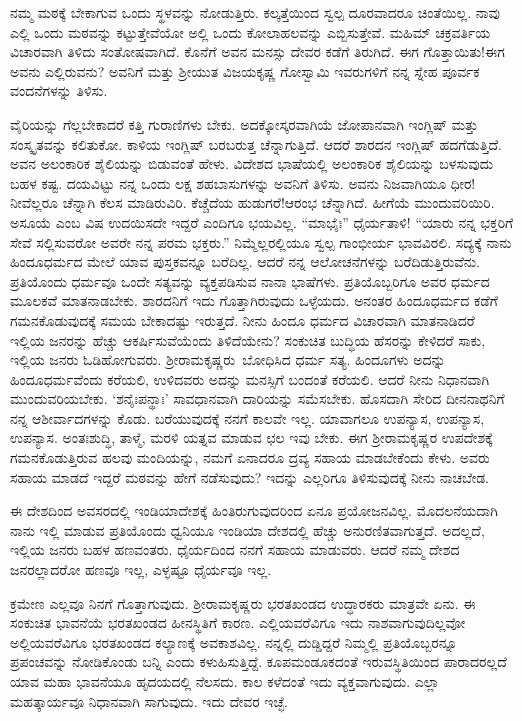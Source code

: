 ನಮ್ಮ ಮಠಕ್ಕೆ ಬೇಕಾಗುವ ಒಂದು ಸ್ಥಳವನ್ನು ನೋಡುತ್ತಿರು. ಕಲ್ಕತ್ತೆಯಿಂದ ಸ್ವಲ್ಪ ದೂರವಾದರೂ ಚಿಂತೆಯಿಲ್ಲ. ನಾವು ಎಲ್ಲಿ ಒಂದು ಮಠವನ್ನು ಕಟ್ಟುತ್ತೇವೆಯೋ ಅಲ್ಲಿ ಒಂದು ಕೋಲಾಹಲವನ್ನು ಎಬ್ಬಿಸುತ್ತೇವೆ. ಮಹಿಮ್ ಚಕ್ರವರ್ತಿಯ ವಿಚಾರವಾಗಿ ತಿಳಿದು ಸಂತೋಷವಾಗಿದೆ. ಕೊನೆಗೆ ಅವನ ಮನಸ್ಸು ದೇವರ ಕಡೆಗೆ ತಿರುಗಿದೆ. ಈಗ ಗೊತ್ತಾಯಿತು!ಈಗ ಅವನು ಎಲ್ಲಿರುವನು? ಅವನಿಗೆ ಮತ್ತು ಶ‍್ರೀಯುತ ವಿಜಯಕೃಷ್ಣ ಗೋಸ್ವಾಮಿ ಇವರುಗಳಿಗೆ ನನ್ನ ಸ್ನೇಹ ಪೂರ್ವಕ ವಂದನೆಗಳನ್ನು ತಿಳಿಸು.

ವೈರಿಯನ್ನು ಗೆಲ್ಲಬೇಕಾದರೆ ಕತ್ತಿ ಗುರಾಣಿಗಳು ಬೇಕು. ಅದಕ್ಕೋಸ್ಕರವಾಗಿಯೆ ಜೋಪಾನವಾಗಿ ಇಂಗ್ಲಿಷ್ ಮತ್ತು ಸಂಸ್ಕೃತವನ್ನು ಕಲಿತುಕೋ. ಕಾಳಿಯ ಇಂಗ್ಲಿಷ್ ಬರಬರುತ್ತ ಚೆನ್ನಾಗುತ್ತಿದೆ. ಆದರೆ ಶಾರದನ ಇಂಗ್ಲಿಷ್ ಹದಗೆಡುತ್ತಿದೆ. ಅವನ ಅಲಂಕಾರಿಕ ಶೈಲಿಯನ್ನು ಬಿಡುವಂತೆ ಹೇಳು. ವಿದೇಶದ ಭಾಷೆಯಲ್ಲಿ ಅಲಂಕಾರಿಕ ಶೈಲಿಯನ್ನು ಬಳಸುವುದು ಬಹಳ ಕಷ್ಟ. ದಯವಿಟ್ಟು ನನ್ನ ಒಂದು ಲಕ್ಷ ಶಹಬಾಸುಗಳನ್ನು ಅವನಿಗೆ ತಿಳಿಸು. ಅವನು ನಿಜವಾಗಿಯೂ ಧೀರ! ನೀವೆಲ್ಲರೂ ಚೆನ್ನಾಗಿ ಕೆಲಸ ಮಾಡಿರುವಿರಿ. ಕೆಚ್ಚೆದೆಯ ಹುಡುಗರೆ!ಆರಂಭ ಚೆನ್ನಾಗಿದೆ. ಹೀಗೆಯೆ ಮುಂದುವರಿಯಿರಿ. ಅಸೂಯೆ ಎಂಬ ವಿಷ ಉದಯಿಸದೇ ಇದ್ದರೆ ಎಂದಿಗೂ ಭಯವಿಲ್ಲ. “ಮಾಭೈಃ” ಧೈರ್ಯತಾಳಿ! “ಯಾರು ನನ್ನ ಭಕ್ತರಿಗೆ ಸೇವೆ ಸಲ್ಲಿಸುವರೋ ಅವರೇ ನನ್ನ ಪರಮ ಭಕ್ತರು.” ನಿಮ್ಮೆಲ್ಲರಲ್ಲಿಯೂ ಸ್ವಲ್ಪ ಗಾಂಭೀರ್ಯ ಭಾವವಿರಲಿ. ಸದ್ಯಕ್ಕೆ ನಾನು ಹಿಂದೂಧರ್ಮದ ಮೇಲೆ ಯಾವ ಪುಸ್ತಕವನ್ನೂ ಬರೆದಿಲ್ಲ. ಆದರೆ ನನ್ನ ಆಲೋಚನೆಗಳನ್ನು ಬರೆದಿಡುತ್ತಿರುವೆನು. ಪ್ರತಿಯೊಂದು ಧರ್ಮವೂ ಒಂದೇ ಸತ್ಯವನ್ನು ವ್ಯಕ್ತಪಡಿಸುವ ನಾನಾ ಭಾಷೆಗಳು. ಪ್ರತಿಯೊಬ್ಬರಿಗೂ ಅವರ ಧರ್ಮದ ಮೂಲಕವೆ ಮಾತನಾಡಬೇಕು. ಶಾರದನಿಗೆ ಇದು ಗೊತ್ತಾಗಿರುವುದು ಒಳ್ಳೆಯದು. ಅನಂತರ ಹಿಂದೂಧರ್ಮದ ಕಡೆಗೆ ಗಮನಕೊಡುವುದಕ್ಕೆ ಸಮಯ ಬೇಕಾದಷ್ಟು ಇರುತ್ತದೆ. ನೀನು ಹಿಂದೂ ಧರ್ಮದ ವಿಚಾರವಾಗಿ ಮಾತನಾಡಿದರೆ ಇಲ್ಲಿಯ ಜನರನ್ನು ಹೆಚ್ಚು ಆಕರ್ಷಿಸುವೆಯೆಂದು ತಿಳಿದೆಯೇನು? ಸಂಕುಚಿತ ಬುದ್ಧಿಯ ಹೆಸರನ್ನು ಕೇಳಿದರೆ ಸಾಕು, ಇಲ್ಲಿಯ ಜನರು ಓಡಿಹೋಗುವರು. \hbox{ಶ‍್ರೀರಾಮಕೃಷ್ಣರು ಬೋಧಿಸಿದ} ಧರ್ಮ ಸತ್ಯ. ಹಿಂದೂಗಳು ಅದನ್ನು ಹಿಂದೂಧರ್ಮವೆಂದು ಕರೆಯಲಿ, ಉಳಿದವರು ಅದನ್ನು ಮನಸ್ಸಿಗೆ ಬಂದಂತೆ ಕರೆಯಲಿ. ಆದರೆ ನೀನು ನಿಧಾನವಾಗಿ ಮುಂದುವರಿಯಬೇಕು. ‘ಶನೈಃಪನ್ಥಾಃ’ ಸಾವಧಾನವಾಗಿ ದಾರಿಯನ್ನು ಸಮೆಸಬೇಕು. ಹೊಸದಾಗಿ ಸೇರಿದ ದೀನನಾಥನಿಗೆ ನನ್ನ ಆಶೀರ್ವಾದಗಳನ್ನು ಕೊಡು. ಬರೆಯುವುದಕ್ಕೆ ನನಗೆ ಕಾಲವೇ ಇಲ್ಲ. ಯಾವಾಗಲೂ ಉಪನ್ಯಾಸ, ಉಪನ್ಯಾಸ, ಉಪನ್ಯಾಸ. ಅಂತಃಶುದ್ಧಿ, ತಾಳ್ಮೆ, ಮರಳಿ ಯತ್ನವ ಮಾಡುವ ಛಲ ಇವು ಬೇಕು. ಈಗ ಶ‍್ರೀರಾಮಕೃಷ್ಣರ ಉಪದೇಶಕ್ಕೆ ಗಮನಕೊಡುತ್ತಿರುವ ಹಲವು ಮಂದಿಯನ್ನು, ನಮಗೆ ಏನಾದರೂ ದ್ರವ್ಯ ಸಹಾಯ ಮಾಡಬೇಕೆಂದು ಕೇಳು. ಅವರು ಸಹಾಯ ಮಾಡದೆ ಇದ್ದರೆ ಮಠವನ್ನು ಹೇಗೆ ನಡೆಸುವುದು? ಇದನ್ನು ಎಲ್ಲರಿಗೂ ತಿಳಿಸುವುದಕ್ಕೆ ನೀನು ನಾಚಬೇಡ.

ಈ ದೇಶದಿಂದ ಅವಸರದಲ್ಲಿ ಇಂಡಿಯಾದೇಶಕ್ಕೆ ಹಿಂತಿರುಗುವುದರಿಂದ ಏನೂ ಪ್ರಯೋಜನವಿಲ್ಲ. ಮೊದಲನೆಯದಾಗಿ ನಾನು ಇಲ್ಲಿ ಮಾಡುವ ಪ್ರತಿಯೊಂದು ಧ್ವನಿಯೂ ಇಂಡಿಯಾ ದೇಶದಲ್ಲಿ ಹೆಚ್ಚು ಅನುರಣಿತವಾಗುತ್ತದೆ. ಅದಲ್ಲದೆ, ಇಲ್ಲಿಯ ಜನರು ಬಹಳ ಹಣವಂತರು. ಧೈರ್ಯದಿಂದ ನನಗೆ ಸಹಾಯ ಮಾಡುವರು. ಆದರೆ ನಮ್ಮ ದೇಶದ ಜನರಲ್ಲಾದರೋ ಹಣವೂ ಇಲ್ಲ, ಎಳ್ಳಷ್ಟೂ ಧೈರ್ಯವೂ ಇಲ್ಲ.

ಕ್ರಮೇಣ ಎಲ್ಲವೂ ನಿನಗೆ ಗೊತ್ತಾಗುವುದು. ಶ‍್ರೀರಾಮಕೃಷ್ಣರು ಭರತಖಂಡದ ಉದ್ಧಾರಕರು ಮಾತ್ರವೇ ಏನು. ಈ ಸಂಕುಚಿತ ಭಾವನೆಯೆ ಭರತಖಂಡದ ಹೀನಸ್ಥಿತಿಗೆ ಕಾರಣ. ಎಲ್ಲಿಯವರೆವಿಗೂ ಇದು ನಾಶವಾಗುವುದಿಲ್ಲವೋ ಅಲ್ಲಿಯವರೆವಿಗೂ ಭರತಖಂಡದ ಕಲ್ಯಾಣಕ್ಕೆ ಅವಕಾಶವಿಲ್ಲ. ನನ್ನಲ್ಲಿ ದುಡ್ಡಿದ್ದರೆ ನಿಮ್ಮಲ್ಲಿ ಪ್ರತಿಯೊಬ್ಬರನ್ನೂ ಪ್ರಪಂಚವನ್ನು ನೋಡಿಕೊಂಡು ಬನ್ನಿ ಎಂದು ಕಳುಹಿಸುತ್ತಿದ್ದೆ. ಕೂಪಮಂಡೂಕದಂತೆ ಇರುವಸ್ಥಿತಿಯಿಂದ ಪಾರಾದರಲ್ಲದೆ ಯಾವ ಮಹಾ ಭಾವನೆಯೂ ಹೃದಯದಲ್ಲಿ ನೆಲಸದು. ಕಾಲ ಕಳೆದಂತೆ ಇದು ವ್ಯಕ್ತವಾಗುವುದು. ಎಲ್ಲಾ ಮಹತ್ಕಾರ್ಯವೂ ನಿಧಾನವಾಗಿ ಸಾಗುವುದು. ಇದು ದೇವರ ಇಚ್ಛೆ.

